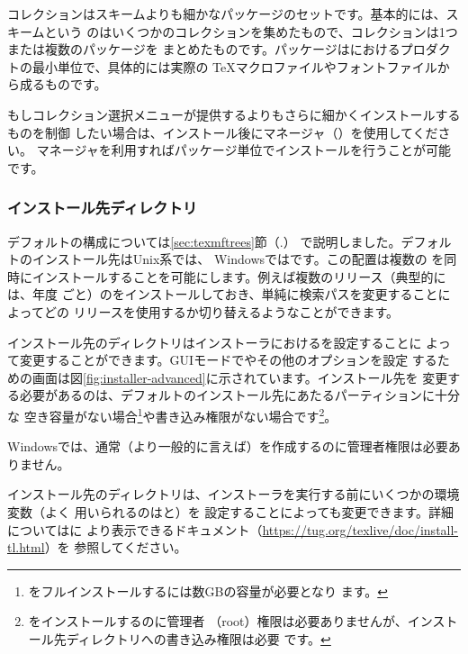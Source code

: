 \documentclass[uplatex,dvipdfmx,12pt,tombow]{jsarticle}
\begin{document}
コレクションはスキームよりも細かなパッケージのセットです。基本的には、スキームという
のはいくつかのコレクションを集めたもので、コレクションは1つまたは複数のパッケージを
まとめたものです。パッケージは\TL におけるプロダクトの最小単位で、具体的には実際の
\TeX マクロファイルやフォントファイルから成るものです。

もしコレクション選択メニューが提供するよりもさらに細かくインストールするものを制御
したい場合は、インストール後に\TL マネージャ（）を使用してください。
\TL マネージャを利用すればパッケージ単位でインストールを行うことが可能です。

\subsubsection{インストール先ディレクトリ}
\label{sec:directories}

デフォルトの\TL 構成については\ref{sec:texmftrees}節（\p.\pageref{sec:texmftrees}）
で説明しました。デフォルトのインストール先はUnix系では、
Windowsではです。この配置は複数の\TL
を同時にインストールすることを可能にします。例えば複数のリリース（典型的には、年度
ごと）の\TL をインストールしておき、単純に検索パスを変更することによってどの
リリースを使用するか切り替えるようなことができます。

インストール先のディレクトリはインストーラにおけるを設定することに
よって変更することができます。GUIモードでやその他のオプションを設定
するための画面は図\ref{fig:installer-advanced}に示されています。インストール先を
変更する必要があるのは、デフォルトのインストール先にあたるパーティションに十分な
空き容量がない場合\footnote{\TL をフルインストールするには数GBの容量が必要となり
ます。}や書き込み権限がない場合です\footnote{\TL をインストールするのに管理者
（root）権限は必要ありませんが、インストール先ディレクトリへの書き込み権限は必要
です。}。

Windowsでは、通常（より一般的に言えば）を作成するのに管理者権限は必要ありません。

インストール先のディレクトリは、インストーラを実行する前にいくつかの環境変数（よく
用いられるのはと）を
設定することによっても変更できます。詳細についてはに
より表示できるドキュメント（\url{https://tug.org/texlive/doc/install-tl.html}）を
参照してください。
\end{document}
